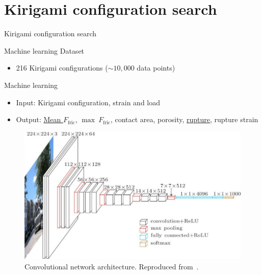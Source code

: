 \documentclass[
	10pt, %
]{beamer}
\begin{document}
\section{Kirigami configuration search} %
\begin{frame}{Kirigami configuration search}
    \tableofcontents[currentsection]
\end{frame}
%
%
\begin{frame}{Machine learning}
	Dataset
	\begin{itemize}
		\item 216 Kirigami configurations ($\sim 10,000$ data points)
	\end{itemize}
	\vspace*{5mm}
	Machine learning
	\begin{itemize}
		\item Input: Kirigami configuration, strain and load
		\item Output: \underline{Mean $F_{\text{fric}}$}, $\max \ F_{\text{fric}}$, contact area, porosity, \underline{rupture}, rupture strain
	\end{itemize}

	\begin{figure}[H]
		\centering
		\includegraphics[width=0.5\linewidth]{../thesis/figures/ML/VGGNet16.jpg}
		\caption{Convolutional network architecture. Reproduced from~\cite{VGGNet_16_image}.}
	\end{figure}
\end{frame}
%
%
%
%
\end{document}
